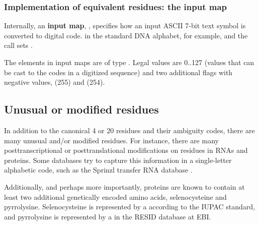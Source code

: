 \subsubsection{Implementation of equivalent residues: the input map}

Internally, an \textbf{input map}, , specifies
how an input ASCII 7-bit text symbol is converted to digital
code.  in the standard DNA alphabet, for
example, and the call 
sets . 

The elements in input maps are of type . Legal
values are 0..127 (values that can be cast to the  codes in a digitized sequence) and two additional flags with
negative values,  (255) and
 (254).

\subsection{Unusual or modified residues}

In addition to the canonical 4 or 20 residues and their ambiguity
codes, there are many unusual and/or modified residues. For instance,
there are many posttranscriptional or posttranslational modifications
on residues in RNAs and proteins. Some databases try to capture this
information in a single-letter alphabetic code, such as the Sprinzl
transfer RNA database \cite{Sprinzl98}. 

Additionally, and perhaps more importantly, proteins are known to
contain at least two additional genetically encoded amino acids,
selenocysteine and pyrrolysine. Selenocysteine is represented by a
 according to the IUPAC standard, and pyrrolysine is
represented by a  in the RESID database at EBI.

